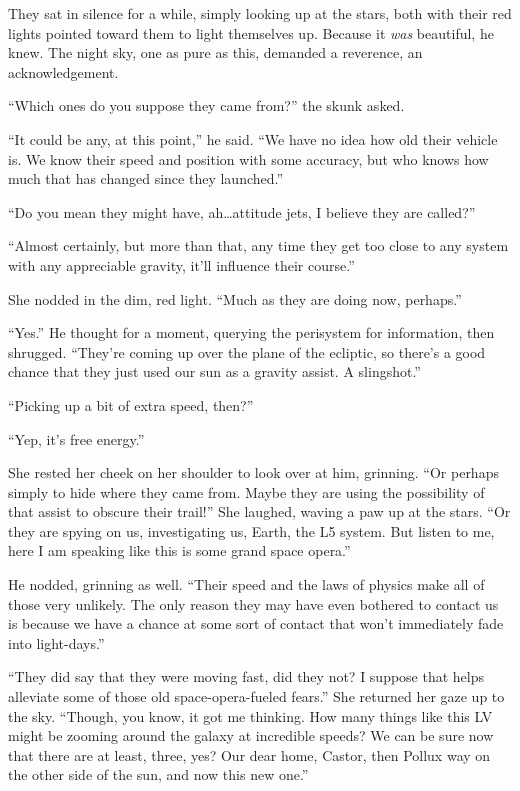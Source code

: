 They sat in silence for a while, simply looking up at the stars, both with their red lights pointed toward them to light themselves up. Because it \emph{was} beautiful, he knew. The night sky, one as pure as this, demanded a reverence, an acknowledgement.

``Which ones do you suppose they came from?'' the skunk asked.

``It could be any, at this point,'' he said. ``We have no idea how old their vehicle is. We know their speed and position with some accuracy, but who knows how much that has changed since they launched.''

``Do you mean they might have, ah\ldots attitude jets, I believe they are called?''

``Almost certainly, but more than that, any time they get too close to any system with any appreciable gravity, it'll influence their course.''

She nodded in the dim, red light. ``Much as they are doing now, perhaps.''

``Yes.'' He thought for a moment, querying the perisystem for information, then shrugged. ``They're coming up over the plane of the ecliptic, so there's a good chance that they just used our sun as a gravity assist. A slingshot.''

``Picking up a bit of extra speed, then?''

``Yep, it's free energy.''

She rested her cheek on her shoulder to look over at him, grinning. ``Or perhaps simply to hide where they came from. Maybe they are using the possibility of that assist to obscure their trail!'' She laughed, waving a paw up at the stars. ``Or they are spying on us, investigating us, Earth, the L5 system. But listen to me, here I am speaking like this is some grand space opera.''

He nodded, grinning as well. ``Their speed and the laws of physics make all of those very unlikely. The only reason they may have even bothered to contact us is because we have a chance at some sort of contact that won't immediately fade into light-days.''

``They did say that they were moving fast, did they not? I suppose that helps alleviate some of those old space-opera-fueled fears.'' She returned her gaze up to the sky. ``Though, you know, it got me thinking. How many things like this LV might be zooming around the galaxy at incredible speeds? We can be sure now that there are at least, three, yes? Our dear home, Castor, then Pollux way on the other side of the sun, and now this new one.''

